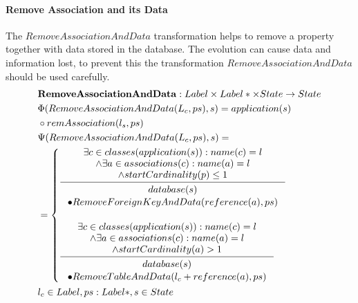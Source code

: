 \documentclass[11pt]{article}
\begin{document}
\paragraph{Remove Association and its Data} The $RemoveAssociationAndData$ transformation helps to remove a property together with data stored in the database. The evolution can cause data and information lost, to prevent this the transformation $RemoveAssociationAndData $ should be used carefully.
\begin{align*}
&	\mathbf{RemoveAssociationAndData} : Label \times Label* \times State \rightarrow State \\
&	\Phi(RemoveAssociationAndData(L_c, ps), s) = application(s)\\ 
& \circ remAssociation(l_s, ps) \\
&	\Psi(RemoveAssociationAndData(L_c, ps), s) = \\
&=  \begin{cases}
 		\inference{\exists c \in classes(application(s)) : name(c) = l\\ 	\wedge \exists a \in associations(c) : name(a) = l \\ \wedge startCardinality(p) \leq 1}{\begin{gathered}
	database(s) \\ \bullet RemoveForeignKeyAndData(reference(a), ps)
\end{gathered}}
 		\\\\
 	\inference{\exists c \in classes(application(s)) : name(c) = l\\ 	\wedge \exists a \in associations(c) : name(a) = l \\ \wedge startCardinality(a) > 1}{\begin{gathered}
	database(s) \\\bullet RemoveTableAndData(l_c + reference(a), ps)
\end{gathered}}
 \end{cases}
	\\
&	l_c \in Label, ps : Label*, s \in State
\end{align*}
\end{document}
